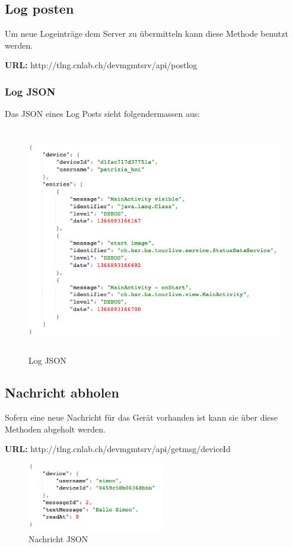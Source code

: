 \subsection{Log posten}

Um neue Logeinträge dem Server zu übermitteln kann diese Methode benutzt werden.

{\bf URL: }http://tlng.cnlab.ch/devmgmtsrv/api/postlog

\subsubsection{Log JSON}

Das JSON eines Log Posts sieht folgendermassen aus:

\begin{figure}[H]
	\centering
	\caption{Log JSON}
	\includegraphics[height=100mm]{images/LogJson.png}
\end{figure}

\subsection{Nachricht abholen}

Sofern eine neue Nachricht für das Gerät vorhanden ist kann sie über diese Methoden abgeholt werden.

{\bf URL: }http://tlng.cnlab.ch/devmgmtsrv/api/getmsg/{deviceId}

\begin{figure}[H]
	\centering
	\caption{Nachricht JSON}
	\includegraphics[height=30mm]{images/MessageJson.png}
\end{figure}


